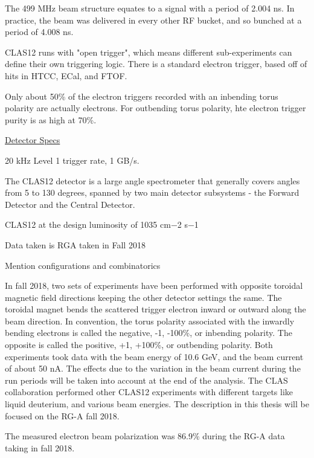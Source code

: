 
The 499 MHz beam structure equates to a signal with a period of 2.004 ns. In practice, the beam was delivered in every other RF bucket, and so bunched at a period of 4.008 ns.

       
            CLAS12 runs with "open trigger", which means different sub-experiments can define their own triggering logic. There is a standard electron trigger, based off of hits in HTCC, ECal, and FTOF. 

        Only about 50\% of the electron triggers recorded with an inbending torus polarity are actually electrons. For outbending torus polarity, hte electron trigger purity is as high at 70\%. 
    
    \href{https://www.jlab.org/Hall-B/clas12-web/}{Detector Specs}
    
    20 kHz Level 1 trigger rate, 1 GB/s.

   The CLAS12 detector is a large angle spectrometer that generally covers angles from 5 to 130 degrees, spanned by two main detector subsystems - the Forward Detector and the Central Detector.

    
   CLAS12 at the design luminosity of 1035 cm−2 s−1

        Data taken is RGA taken in Fall 2018

        Mention configurations and combinatorics


In fall 2018, two sets of experiments have been performed with opposite toroidal magnetic field directions
keeping the other detector settings the same. The toroidal magnet bends the scattered
trigger electron inward or outward along the beam direction. In convention, the torus
polarity associated with the inwardly bending electrons is called the negative, -1,
-100\%, or inbending polarity. The opposite is called the positive, +1, +100\%, or
outbending polarity. Both experiments took data with the beam energy of 10.6 GeV,
and the beam current of about 50 nA. The effects due to the variation in the beam
current during the run periods will be taken into account at the end of the analysis.
The CLAS collaboration performed other CLAS12 experiments with different targets
like liquid deuterium, and various beam energies. The description in this thesis
will be focused on the RG-A fall 2018.

The measured
electron beam polarization was 86.9\% during the RG-A data taking in fall 2018.
